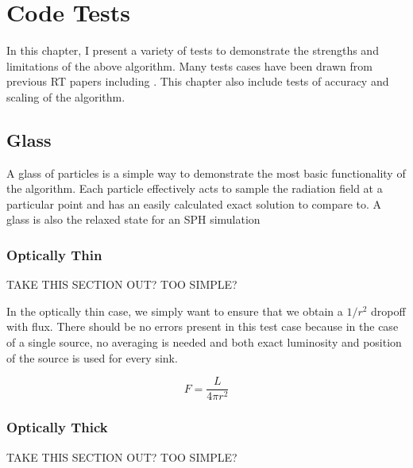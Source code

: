 \pagestyle{fancy}
\headheight 20pt
\chead{}
\lfoot{}
\cfoot{\thepage}
\rfoot{}
\renewcommand{\headrulewidth}{0.1pt}
\renewcommand{\footrulewidth}{0.1pt}


\chapter{Code Tests}
\label{chap:codetests}
\thispagestyle{fancy}

In this chapter, I present a variety of tests to demonstrate the strengths and limitations of the above algorithm. Many tests cases have been drawn from previous RT papers including \citet{ilievEt06,gendelevKrumholz12,skinnerOstriker13}. This chapter also include tests of accuracy and scaling of the algorithm.

\section{Glass}
\label{sec:glass}

A glass of particles is a simple way to demonstrate the most basic functionality of the algorithm. Each particle effectively acts to sample the radiation field at a particular point and has an easily calculated exact solution to compare to. A glass is also the relaxed state for an SPH simulation

\subsection{Optically Thin}
\label{sec:thinglass}

{TAKE THIS SECTION OUT? TOO SIMPLE?}

In the optically thin case, we simply want to ensure that we obtain a $1/r^2$ dropoff with flux. There should be no errors present in this test case because in the case of a single source, no averaging is needed and both exact luminosity and position of the source is used for every sink.

\begin{equation}
\label{eq:flux}
F = \frac{L}{4\pi r^2}
\end{equation}

\subsection{Optically Thick}
\label{sec:thickglass}

{TAKE THIS SECTION OUT? TOO SIMPLE?}

